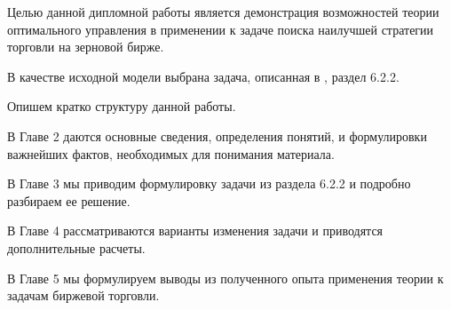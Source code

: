 Целью данной дипломной работы является демонстрация возможностей теории оптимального управления в применении к задаче поиска наилучшей стратегии торговли на зерновой бирже.

В качестве исходной модели выбрана задача, описанная в \cite{sethi_optimal_2000}, раздел 6.2.2.

Опишем кратко структуру данной работы.

В Главе 2 даются основные сведения, определения понятий, и формулировки важнейших фактов, необходимых для понимания материала.

В Главе 3 мы приводим формулировку задачи из раздела 6.2.2 и подробно разбираем ее решение.

В Главе 4 рассматриваются варианты изменения задачи и приводятся дополнительные расчеты.

В Главе 5 мы формулируем выводы из полученного опыта применения теории к задачам биржевой торговли.